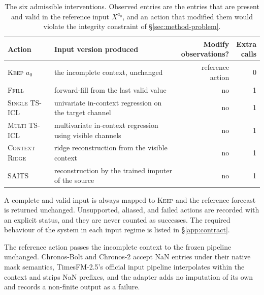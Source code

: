 \documentclass{article}
\begin{document}
\begin{table}[!t]
  \caption{The six admissible interventions. Observed entries are the entries that are
  present and valid in the reference input $X^{a_0}$, and an action that modified them would
  violate the integrity constraint of \S\ref{sec:method-problem}.}
  \label{tab:app-catalog}
  \centering
  \small
  \setlength{\tabcolsep}{4pt}
\begin{tabularx}{\textwidth}{@{}lXrr@{}}
    \toprule
    Action & Input version produced & \shortstack[r]{Modify\\observations?} & \shortstack[r]{Extra\\calls} \\
    \midrule
    \textsc{Keep} $a_0$   & the incomplete context, unchanged & reference action & 0 \\
    \textsc{Ffill}        & forward-fill from the last valid value & no & 1 \\
    \textsc{Single TS-ICL}& univariate in-context regression on the target channel & no & 1 \\
    \textsc{Multi TS-ICL} & multivariate in-context regression using visible channels & no & 1 \\
    \textsc{Context Ridge}& ridge reconstruction from the visible context & no & 1 \\
    \textsc{SAITS}        & reconstruction by the trained imputer of the source & no & 1 \\
    \bottomrule
  \end{tabularx}
\end{table}

A complete and valid input is always mapped to \textsc{Keep} and the reference forecast is
returned unchanged. Unsupported, aliased, and failed actions are recorded with an explicit
status, and they are never counted as successes. The required behaviour of the system in each
input regime is listed in \S\ref{app:contract}.

The reference action passes the incomplete context to the frozen pipeline unchanged.
Chronos-Bolt and Chronos-2 accept NaN entries under their native mask semantics, TimesFM-2.5's
official input pipeline interpolates within the context and strips NaN prefixes, and the adapter
adds no imputation of its own and records a non-finite output as a failure.
\end{document}
